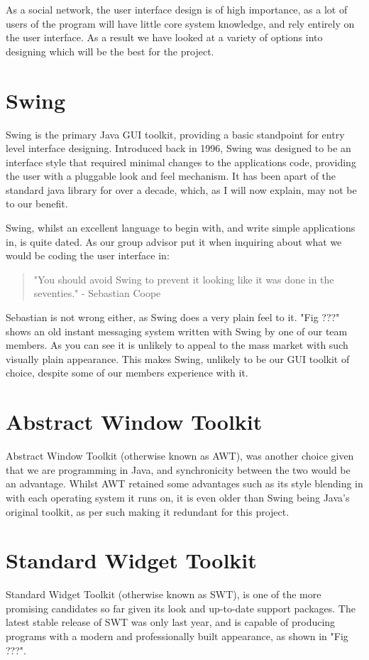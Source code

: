 As a social network, the user interface design is of high importance, as a lot 
of users of the program will have little core system knowledge, and rely 
entirely on the user interface. As a result we have looked at a variety of 
options into designing which will be the best for the project.

\section{Swing}
Swing is the primary Java GUI toolkit, providing a basic standpoint for entry 
level interface designing. Introduced back in 1996, Swing was designed to be 
an interface style that required minimal changes to the applications code, 
providing the user with a pluggable look and feel mechanism. It has been apart 
of the standard java library for over a decade, which, as I will now explain, 
may not be to our benefit.

Swing, whilst an excellent language to begin with, and write simple applications
in, is quite dated. As our group advisor put it when inquiring about what we 
would be coding the user interface in:

\begin{quote}
"You should avoid Swing to prevent it looking like it was done in the 
seventies." - Sebastian Coope
\end{quote}

Sebastian is not wrong either, as Swing does a very plain feel to it. "Fig ???" 
shows an old instant messaging system written with Swing by one of our team 
members. As you can see it is unlikely to appeal to the mass market with such 
visually plain appearance. This makes Swing, unlikely to be our GUI toolkit of 
choice, despite some of our members experience with it.

\section{Abstract Window Toolkit}
Abstract Window Toolkit (otherwise known as AWT), was another choice given 
that we are programming in Java, and synchronicity between the two would be an 
advantage. Whilst AWT retained some advantages such as its style blending in 
with each operating system it runs on, it is even older than Swing being Java's 
original toolkit, as per such making it redundant for this project.

\section{Standard Widget Toolkit}
Standard Widget Toolkit (otherwise known as SWT), is one of the more promising 
candidates so far given its look and up-to-date support packages. The latest 
stable release of SWT was only last year, and is capable of producing programs 
with a modern and professionally built appearance, as shown in "Fig ???".

